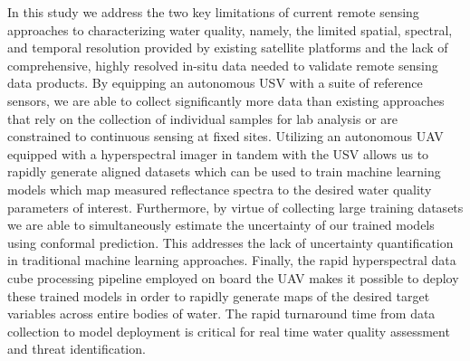 \documentclass[sensors,article,submit,pdftex,moreauthors]{Definitions/mdpi}
\begin{document}
In this study we address the two key limitations of current remote sensing approaches to characterizing water quality, namely, the limited spatial, spectral, and temporal resolution provided by existing satellite platforms and the lack of comprehensive, highly resolved in-situ data needed to validate remote sensing data products. By equipping an autonomous USV with a suite of reference sensors, we are able to collect significantly more data than existing approaches that rely on the collection of individual samples for lab analysis or are constrained to continuous sensing at fixed sites. Utilizing an autonomous UAV equipped with a hyperspectral imager in tandem with the USV allows us to rapidly generate aligned datasets which can be used to train machine learning models which map measured reflectance spectra to the desired water quality parameters of interest. Furthermore, by virtue of collecting large training datasets we are able to simultaneously estimate the uncertainty of our trained models using conformal prediction. This addresses the lack of uncertainty quantification in traditional machine learning approaches. Finally, the rapid hyperspectral data cube processing pipeline employed on board the UAV makes it possible to deploy these trained models in order to rapidly generate maps of the desired target variables across entire bodies of water. The rapid turnaround time from data collection to model deployment is critical for real time water quality assessment and threat identification. 



\vspace{6pt} 


\end{document}

